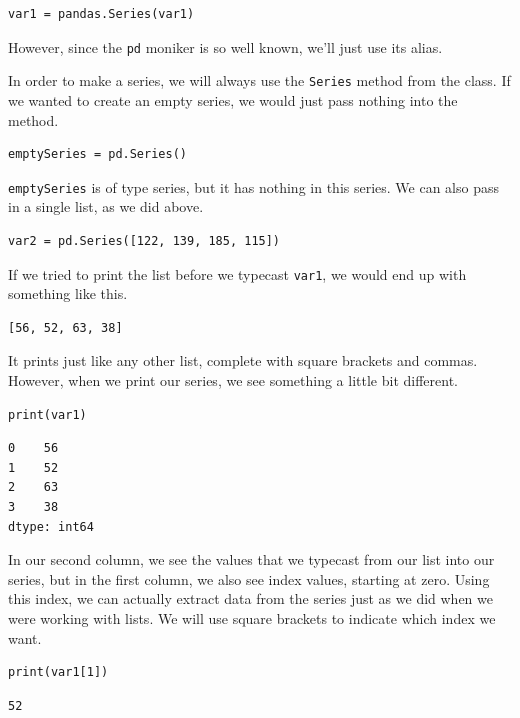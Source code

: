 \begin{lstlisting}[style=pippython]
var1 = pandas.Series(var1)
\end{lstlisting}
However, since the \verb|pd| moniker is so well known, we'll just use its alias.\par
In order to make a series, we will always use the \verb|Series| method from the  class. If we wanted to create an empty series, we would just pass nothing into the method.
\begin{lstlisting}[style=pippython]
emptySeries = pd.Series()
\end{lstlisting}
\verb|emptySeries| is of type series, but it has nothing in this series. We can also pass in a single list, as we did above.
\begin{lstlisting}[style=pippython]
var2 = pd.Series([122, 139, 185, 115])
\end{lstlisting}\par
{}
If we tried to print the list before we typecast \verb|var1|, we would end up with something like this.
\begin{lstlisting}
[56, 52, 63, 38]
\end{lstlisting}
It prints just like any other list, complete with square brackets and commas. However, when we print our series, we see something a little bit different.
\begin{lstlisting}[style=pippython]
print(var1)
\end{lstlisting}
\begin{lstlisting}
0    56
1    52
2    63
3    38
dtype: int64
\end{lstlisting}
In our second column, we see the values that we typecast from our list into our series, but in the first column, we also see index values, starting at zero. Using this index, we can actually extract data from the series just as we did when we were working with lists. We will use square brackets to indicate which index we want.
\begin{lstlisting}[style=pippython]
print(var1[1])
\end{lstlisting}
\begin{lstlisting}
52
\end{lstlisting}\par
